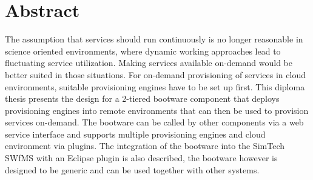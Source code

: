 \chapter*{Abstract}

The assumption that services should run continuously is no longer reasonable in science oriented environments, where dynamic working approaches lead to fluctuating service utilization.
Making services available on-demand would be better suited in those situations.
For on-demand provisioning of services in cloud environments, suitable provisioning engines have to be set up first.
This diploma thesis presents the design for a 2-tiered bootware component that deploys provisioning engines into remote environments that can then be used to provision services on-demand.
The bootware can be called by other components via a web service interface and supports multiple provisioning engines and cloud environment via plugins.
The integration of the bootware into the SimTech SWfMS with an Eclipse plugin is also described, the bootware however is designed to be generic and can be used together with other systems.
